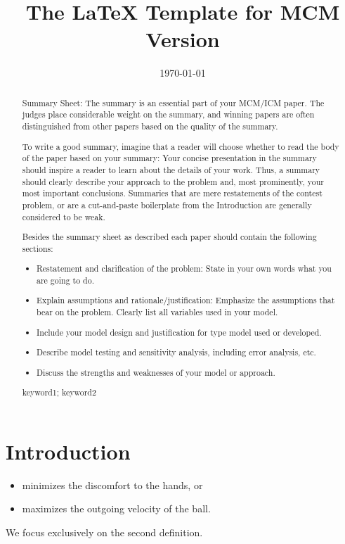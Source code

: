 \documentclass{mcmthesis}
\title{The \LaTeX{} Template for MCM Version \MCMversion}
\date{\today}
\begin{document}
\begin{abstract}

Summary Sheet: The summary is an essential part of your MCM/ICM paper. 
The judges place considerable weight on the summary, 
and winning papers are often distinguished from other papers based on the quality of the summary.

To write a good summary, imagine that a reader will choose whether to read the body of the paper based on your summary: 
Your concise presentation in the summary should inspire a reader to learn about the details of your work. 
Thus, a summary should clearly describe your approach to the problem and, most prominently, your most important conclusions.  
Summaries that are mere restatements of the contest problem, or are a cut-and-paste boilerplate from the Introduction are generally considered to be weak.

Besides the summary sheet as described each paper should contain the following sections:

\begin{itemize}
\item Restatement and clarification of the problem: State in your own words what you are going to do.
\item Explain assumptions and rationale/justification: Emphasize the assumptions that bear on the problem. Clearly list all variables used in your model.
\item Include your model design and justification for type model used or developed.
\item Describe model testing and sensitivity analysis, including error analysis, etc.
\item Discuss the strengths and weaknesses of your model or approach.
\end{itemize}

\begin{keywords}
keyword1; keyword2
\end{keywords}

\end{abstract}
\maketitle
\section{Introduction}


\begin{itemize}
\item minimizes the discomfort to the hands, or
\item maximizes the outgoing velocity of the ball.
\end{itemize}
We focus exclusively on the second definition.
\end{document}
